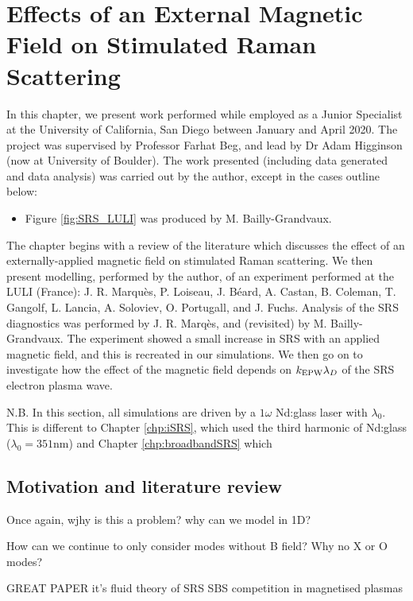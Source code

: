 \chapter{Effects of an External Magnetic Field on Stimulated Raman Scattering}
\label{chp:magSRS}

In this chapter, we present work performed while employed as a Junior Specialist at the University of California, San Diego between January and April 2020. The project was supervised by Professor Farhat Beg, and lead by Dr Adam Higginson (now at University of Boulder). The work presented (including data generated and data analysis) was carried out by the author, except in the cases outline below:
\begin{itemize}
\item Figure \ref{fig:SRS_LULI} was produced by M. Bailly-Grandvaux.
\end{itemize}

The chapter begins with a review of the literature which discusses the effect of an externally-applied magnetic field on stimulated Raman scattering. We then present modelling, performed by the author, of an experiment performed at the \acrlong{LULI} (France): J. R. Marqu\`es, P. Loiseau, J. B\'eard, A. Castan, B. Coleman, T. Gangolf, L. Lancia, A. Soloviev, O. Portugall, and J. Fuchs. Analysis of the SRS diagnostics was performed by J. R. Marq\`es, and (revisited) by M. Bailly-Grandvaux.  The experiment showed a small increase in SRS with an applied magnetic field, and this is recreated in our simulations. We then go on to investigate how the effect of the magnetic field depends on $k_\mathrm{EPW}\lambda_D$ of the SRS electron plasma wave.

N.B. In this section, all simulations are driven by a $1\omega$ Nd:glass laser with $\lambda_0$. This is different to Chapter \ref{chp:iSRS}, which used the third harmonic of Nd:glass ($\lambda_0=351\si{\nano\metre}$) and Chapter \ref{chp:broadbandSRS} which 

\section{Motivation and literature review}

Once again, wjhy is this a problem? why can we model in 1D? 

How can we continue to only consider modes without B field? Why no X or O modes?

GREAT PAPER it's fluid theory of SRS SBS competition in magnetised plasmas\citep{Vyas2016}

